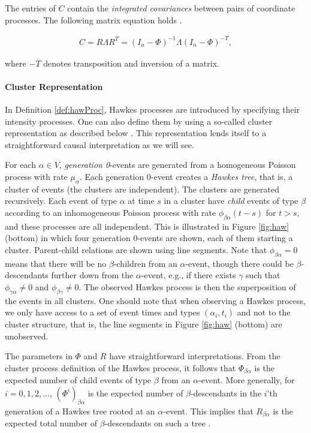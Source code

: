 \documentclass[accepted]{uai2021} %
\begin{document}
The entries of $C$ contain the \emph{integrated covariances} between pairs of 
coordinate processes. The following matrix equation holds 
\citep{jovanovic2015,	 
achab2017}.


\begin{align}
	C = R \Lambda R^T = (I_n - \Phi)^{-1}\Lambda(I_n - \Phi)^{-T},
	\label{eq:covarEq}
\end{align}


where $-T$ denotes transposition and 
inversion of a matrix.


\paragraph{Cluster Representation}

In Definition \ref{def:hawProc}, Hawkes processes are introduced by specifying 
their intensity processes. One can also define them by using a so-called 
cluster 
representation as described below \citep{jovanovic2015}. This representation 
lends itself to a 
straightforward causal interpretation as we will see.

For each $\alpha\in V$, \emph{generation 0}-events are generated from a 
homogeneous Poisson process with rate $\mu_\alpha$. Each generation 0-event 
creates a \emph{Hawkes tree}, that is, a cluster of events (the clusters are 
independent). The clusters are generated recursively. Each event of type 
$\alpha$ at time $s$ in a cluster have \emph{child} events of type $\beta$ 
according 
to an inhomogeneous Poisson process with rate $\phi_{\beta\alpha}(t-s)$ for $t 
> s$, and these processes are all independent. This is illustrated in Figure 
\ref{fig:haw} (bottom) in which four 
generation 0-events are shown, each of them starting a cluster. Parent-child 
relations are shown using line segments. Note that 
$\phi_{\beta\alpha} = 0$ means that there will be no $\beta$-children from an 
$\alpha$-event, though there could be $\beta$-descendants further down from the 
$\alpha$-event, e.g., if 
there exists $\gamma$ such that $\phi_{\gamma\alpha} \neq 0$ and 
$\phi_{\beta\gamma} \neq 0$. The observed Hawkes process is then the 
superposition of the events in all clusters. One should note that when 
observing a Hawkes process, we only have access to a set of event times and 
types
$(\alpha_i, t_i)$ and not to the cluster structure, that is, the line segments 
in Figure \ref{fig:haw} (bottom) are unobserved.

The parameters in $\Phi$ and $R$ have straightforward interpretations. From the 
cluster process definition of the Hawkes process, it follows that 
$\Phi_{\beta\alpha}$ is the 
expected number of child events of type $\beta$ from an 
$\alpha$-event. More generally, for $i = 0,1,2,\ldots$, 
$(\Phi^i)_{\beta\alpha}$ is the 
expected number of $\beta$-descendants in the $i$'th generation of a Hawkes 
tree rooted at an 
$\alpha$-event. This implies that $R_{\beta\alpha}$ is the expected total 
number of $\beta$-descendants on such a tree
\citep{jovanovic2015}.
\end{document}
